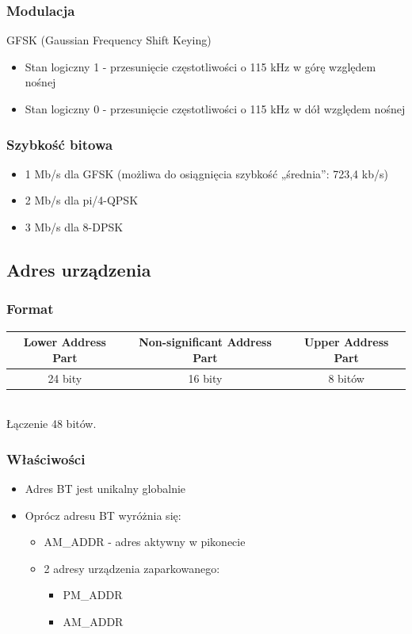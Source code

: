 \subsubsection{Modulacja}
GFSK (Gaussian Frequency Shift Keying)\\
\begin{itemize}
	\item Stan logiczny 1 - przesunięcie częstotliwości o 115 kHz w górę względem nośnej
	\item Stan logiczny 0 - przesunięcie częstotliwości o 115 kHz w dół względem nośnej
\end{itemize}
\subsubsection{Szybkość bitowa}
\begin{itemize}
	\item 1 Mb/s dla GFSK (możliwa do osiągnięcia szybkość „średnia”: 723,4 kb/s)
	\item 2 Mb/s dla pi/4-QPSK
	\item 3 Mb/s dla 8-DPSK
\end{itemize}


\subsection{Adres urządzenia}
\subsubsection{Format}
\begin{tabular}{|c|c|c|}
	\hline Lower Address Part & Non-significant Address Part & Upper Address Part \\ 
	\hline 24 bity & 16 bity & 8 bitów \\ 
	\hline 
\end{tabular}\\
Łączenie 48 bitów.
\subsubsection{Właściwości}
\begin{itemize}
	\item Adres BT jest unikalny globalnie
	\item Oprócz adresu BT wyróżnia się:
	\begin{itemize}
		\item AM\_ADDR - adres aktywny w pikonecie
		\item 2 adresy urządzenia zaparkowanego:
		\begin{itemize}
			\item PM\_ADDR
			\item AM\_ADDR
		\end{itemize}
	\end{itemize}
\end{itemize}

